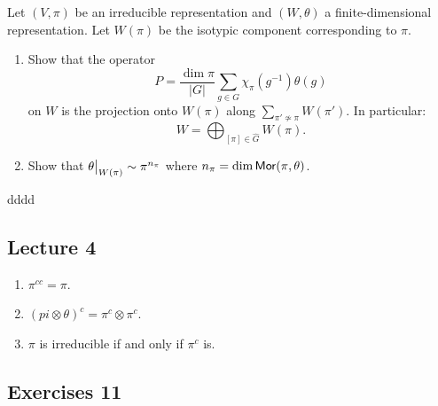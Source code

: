 \documentclass[11pt, english]{article}
\begin{document}
\begin{exc}
 Let $(V,\pi)$ be an irreducible representation and $(W,\theta)$ a finite-dimensional representation. Let $W(\pi)$ be the isotypic component corresponding to $\pi$.
 \begin{enumerate}
 \item Show that the operator
$$
P = \frac{\dim \pi}{\lvert G \rvert} \sum_{g \in G} \chi_\pi(g^{-1})\theta(g)
$$
on $W$ is the projection onto $W(\pi)$ along $\sum_{\pi' \not \simeq \pi} W(\pi')$. In particular:
$$
W = \bigoplus_{[\pi] \in \widehat G} W(\pi).
$$
\item Show that $\restr{\theta}{W(\pi)} \sim \pi^{n_\pi}$ where $n_\pi = \dim \mathsf{Mor}(\pi,\theta)$.
 \end{enumerate}
\end{exc}

\begin{sol}
dddd
\end{sol}


\subsection{Lecture 4}

\begin{exc}
  \begin{enumerate}
  \item $\pi^{cc}=\pi$.
\item $(pi \otimes \theta)^c = \pi^c \otimes \pi^c$.
\item $\pi$ is irreducible if and only if $\pi^c$ is.
  \end{enumerate}
\end{exc}

\subsection{Exercises 11}
\end{document}
